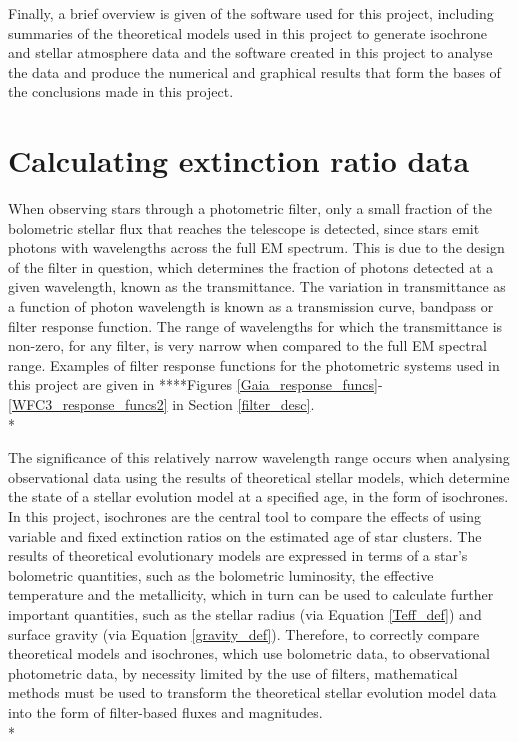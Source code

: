 \documentclass[12pt, a4paper]{report}
\begin{document}
Finally, a brief overview is given of the software used for this project, including summaries of the theoretical models used in this project to generate isochrone and stellar atmosphere data and the software created in this project to analyse the data and produce the numerical and graphical results that form the bases of the conclusions made in this project.

\section{Calculating extinction ratio data} \label{ext_ratio_data}

When observing stars through a photometric filter, only a small fraction of the bolometric stellar flux that reaches the telescope is detected, since stars emit photons with wavelengths across the full EM spectrum. This is due to the design of the filter in question, which determines the fraction of photons detected at a given wavelength, known as the transmittance. The variation in transmittance as a function of photon wavelength is known as a transmission curve, bandpass or filter response function. The range of wavelengths for which the transmittance is non-zero, for any filter, is very narrow when compared to the full EM spectral range. Examples of filter response functions for the photometric systems used in this project are given in ****Figures \ref{Gaia_response_funcs}-\ref{WFC3_response_funcs2} in Section \ref{filter_desc}. \\* 

The significance of this relatively narrow wavelength range occurs when analysing observational data using the results of theoretical stellar models, which determine the state of a stellar evolution model at a specified age, in the form of isochrones. In this project, isochrones are the central tool to compare the effects of using variable and fixed extinction ratios on the estimated age of star clusters. The results of theoretical evolutionary models are expressed in terms of a star's bolometric quantities, such as the bolometric luminosity, the effective temperature and the metallicity, which in turn can be used to calculate further important quantities, such as the stellar radius (via Equation \ref{Teff_def}) and surface gravity (via Equation \ref{gravity_def}). Therefore, to correctly compare theoretical models and isochrones, which use bolometric data, to observational photometric data, by necessity limited by the use of filters, mathematical methods must be used to transform the theoretical stellar evolution model data into the form of filter-based fluxes and magnitudes.\\*
\end{document}

